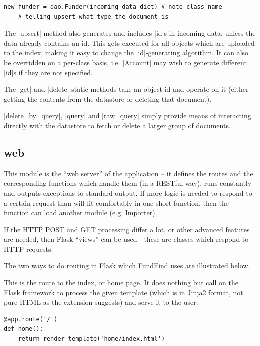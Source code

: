 \begin{verbatim}
new_funder = dao.Funder(incoming_data_dict) # note class name
    # telling upsert what type the document is
\end{verbatim}

The |upsert| method also generates and includes |id|s in incoming data, unless the data already contains an id. This gets executed for all objects which are uploaded to the index, making it easy to change the |id|-generating algorithm. It can also be overridden on a per-class basis, i.e. |Account| may wish to generate different |id|s if they are not specified.

The |get| and |delete| static methods take an object id and operate on it (either getting the contents from the datastore or deleting that document).

|delete_by_query|, |query| and |raw_query| simply provide means of interacting directly with the datastore to fetch or delete a larger group of documents.

\subsection{web}
\label{design-web}
This module is the ``web server'' of the application – it defines the routes and the corresponding functions which handle them (in a RESTful way), runs constantly and outputs exceptions to standard output. If more logic is needed to respond to a certain request than will fit comfortably in one short function, then the function can load another module (e.g. Importer).

If the HTTP POST and GET processing differ a lot, or other advanced features are needed, then Flask ``views'' can be used - these are classes which respond to HTTP requests.

The two ways to do routing in Flask which FundFind uses are illustrated below.

This is the route to the index, or home page. It does nothing but call on the Flask framework to process the given template (which is in Jinja2 format, not pure HTML as the extension suggests) and serve it to the user.
\begin{verbatim}
@app.route('/')
def home():
    return render_template('home/index.html')
\end{verbatim}

